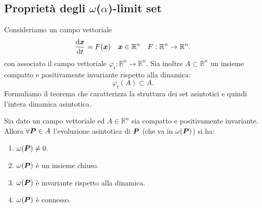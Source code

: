 \subsection{Proprietà degli  $\omega$($\alpha$)-limit set}%
Consideriamo un campo vettoriale 
\[
    \frac{\text{d} \boldsymbol{x}}{\text{d} t} = F(\boldsymbol{x}) \quad  \boldsymbol{x}\in \mathbb{R}^n \quad  F: \mathbb{R}^n\to \mathbb{R}^n
.\] 
con associato il campo vettoriale $\varphi_t:\mathbb{R}^n\to \mathbb{R}^n$. Sia inoltre $A \subset \mathbb{R}^n$ un insieme compatto e positivamente invariante rispetto alla dinamica:
\[
    \varphi_t(A) \subset A
.\] 
Formuliamo il teorema che caratterizza la struttura dei set asintotici e quindi l'intera dinamica asintotica.
\begin{thm}
    Sia dato un campo vettoriale ed $A \in \mathbb{R}^n$ sia compatto e positivamente invariante. Allora $\forall \boldsymbol{P} \in A$ l'evoluzione asintotica di $\boldsymbol{P}$ (che va in $\omega (\boldsymbol{P})$) si ha:
    \begin{enumerate}
	\item $\omega (\boldsymbol{P}) \neq 0$.
	\item $\omega (\boldsymbol{P})$ è un insieme chiuso.
	\item $\omega (\boldsymbol{P})$ è invariante rispetto alla dinamica.
	\item $\omega (\boldsymbol{P})$ è connesso.
    \end{enumerate}
\end{thm}
\noindent
